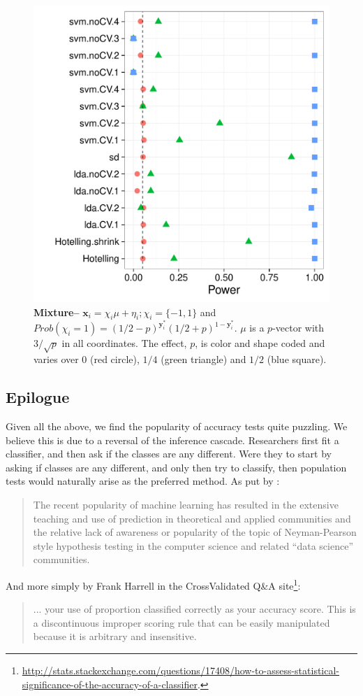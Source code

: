 \documentclass[12pt,a4paper]{article}
\theoremstyle{definition}
\newcommand{\set}[1]{\{ #1 \}} %
\newcommand{\prob}[1]{Prob( #1 )} %
\newcommand{\rv}[1]{\mathbf{#1}} %
\newcommand{\x}{\rv x} %
\newcommand{\y}{\rv y} %
\begin{document}
\begin{figure}[ht]
\centering
	  \includegraphics[width=0.7\linewidth]{"art/2016-08-08 07:33:05"}
	  \caption{\textbf{Mixture--} $\x_i = \chi_i \mu + \eta_i; \chi_i = \set{-1,1}$ and $\prob{\chi_i=1}=(1/2-p)^{\y^*_i}  (1/2+p)^{1-\y^*_i}$. $\mu$ is a $p$-vector with $3/\sqrt{p}$ in all coordinates.
	  The effect, $p$, is color and shape coded and varies over $0$ (red circle), $1/4$ (green triangle) and $1/2$ (blue square). }
	\label{fig:golland}
\end{figure}










\subsection{Epilogue}
Given all the above, we find the popularity of accuracy tests quite puzzling. 
We believe this is due to a reversal of the inference cascade. 
Researchers first fit a classifier, and then ask if the classes are any different.
Were they to start by asking if classes are any different, and only then try to classify, then population tests would naturally arise as the preferred method. 
As put by \cite{ramdas_classification_2016}:
\begin{quote}
The recent popularity of machine learning has resulted in the extensive teaching and use
of prediction in theoretical and applied communities and the relative lack of awareness or
popularity of the topic of Neyman-Pearson style hypothesis testing in the computer science
and related ``data science'' communities.
\end{quote}
And more simply by Frank Harrell in the \textsf{CrossValidated} Q\&A site\footnote{\url{http://stats.stackexchange.com/questions/17408/how-to-assess-statistical-significance-of-the-accuracy-of-a-classifier}.}:
\begin{quote}
 ... your use of proportion classified correctly as your accuracy score. This is a discontinuous improper scoring rule that can be easily manipulated because it is arbitrary and insensitive.
\end{quote}
\end{document}
